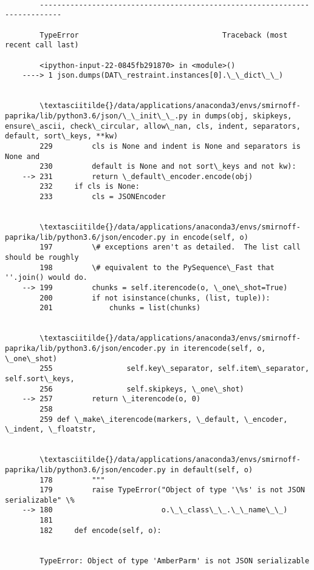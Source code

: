 \documentclass[11pt]{article}
\begin{document}
    \begin{Verbatim}[commandchars=\\\{\}]

        ---------------------------------------------------------------------------

        TypeError                                 Traceback (most recent call last)

        <ipython-input-22-0845fb291870> in <module>()
    ----> 1 json.dumps(DAT\_restraint.instances[0].\_\_dict\_\_)
    

        \textasciitilde{}/data/applications/anaconda3/envs/smirnoff-paprika/lib/python3.6/json/\_\_init\_\_.py in dumps(obj, skipkeys, ensure\_ascii, check\_circular, allow\_nan, cls, indent, separators, default, sort\_keys, **kw)
        229         cls is None and indent is None and separators is None and
        230         default is None and not sort\_keys and not kw):
    --> 231         return \_default\_encoder.encode(obj)
        232     if cls is None:
        233         cls = JSONEncoder


        \textasciitilde{}/data/applications/anaconda3/envs/smirnoff-paprika/lib/python3.6/json/encoder.py in encode(self, o)
        197         \# exceptions aren't as detailed.  The list call should be roughly
        198         \# equivalent to the PySequence\_Fast that ''.join() would do.
    --> 199         chunks = self.iterencode(o, \_one\_shot=True)
        200         if not isinstance(chunks, (list, tuple)):
        201             chunks = list(chunks)


        \textasciitilde{}/data/applications/anaconda3/envs/smirnoff-paprika/lib/python3.6/json/encoder.py in iterencode(self, o, \_one\_shot)
        255                 self.key\_separator, self.item\_separator, self.sort\_keys,
        256                 self.skipkeys, \_one\_shot)
    --> 257         return \_iterencode(o, 0)
        258 
        259 def \_make\_iterencode(markers, \_default, \_encoder, \_indent, \_floatstr,


        \textasciitilde{}/data/applications/anaconda3/envs/smirnoff-paprika/lib/python3.6/json/encoder.py in default(self, o)
        178         """
        179         raise TypeError("Object of type '\%s' is not JSON serializable" \%
    --> 180                         o.\_\_class\_\_.\_\_name\_\_)
        181 
        182     def encode(self, o):


        TypeError: Object of type 'AmberParm' is not JSON serializable

    \end{Verbatim}
\end{document}
